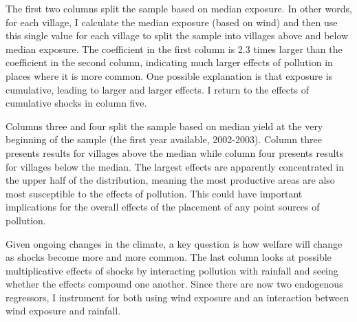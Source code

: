 \documentclass[
]{article}
\begin{document}
The first two columns split the sample based on median exposure. In other words, for each village, I calculate the median exposure (based on wind) and then use this single value for each village to split the sample into villages above and below median exposure. The coefficient in the first column is 2.3 times larger than the coefficient in the second column, indicating much larger effects of pollution in places where it is more common. One possible explanation is that exposure is cumulative, leading to larger and larger effects. I return to the effects of cumulative shocks in column five.

Columns three and four split the sample based on median yield at the very beginning of the sample (the first year available, 2002-2003). Column three presents results for villages above the median while column four presents results for villages below the median. The largest effects are apparently concentrated in the upper half of the distribution, meaning the most productive areas are also most susceptible to the effects of pollution. This could have important implications for the overall effects of the placement of any point sources of pollution.

Given ongoing changes in the climate, a key question is how welfare will change as shocks become more and more common. The last column looks at possible multiplicative effects of shocks by interacting pollution with rainfall and seeing whether the effects compound one another. Since there are now two endogenous regressors, I instrument for both using wind exposure and an interaction between wind exposure and rainfall.
\end{document}
